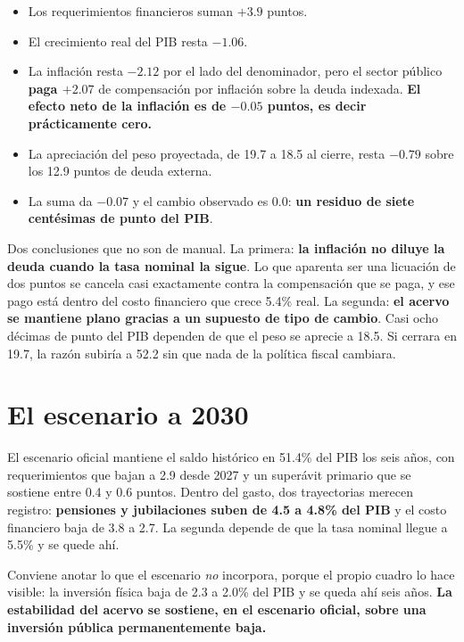 \begin{itemize}
\item Los requerimientos financieros suman \textbf{$+3.9$} puntos.
\item El crecimiento real del PIB resta \textbf{$-1.06$}.
\item La inflación resta \textbf{$-2.12$} por el lado del denominador, pero el
sector público \textbf{paga $+2.07$} de compensación por inflación sobre la deuda
indexada. \textbf{El efecto neto de la inflación es de $-0.05$ puntos, es decir
prácticamente cero.}
\item La apreciación del peso proyectada, de 19.7 a 18.5 al cierre, resta
\textbf{$-0.79$} sobre los 12.9 puntos de deuda externa.
\item La suma da $-0.07$ y el cambio observado es 0.0: \textbf{un residuo de siete
centésimas de punto del PIB}.
\end{itemize}

Dos conclusiones que no son de manual. La primera: \textbf{la inflación no
diluye la deuda cuando la tasa nominal la sigue}. Lo que aparenta ser una
licuación de dos puntos se cancela casi exactamente contra la compensación que se
paga, y ese pago está dentro del costo financiero que crece 5.4\% real. La segunda:
\textbf{el acervo se mantiene plano gracias a un supuesto de tipo de cambio}. Casi
ocho décimas de punto del PIB dependen de que el peso se aprecie a 18.5. Si
cerrara en 19.7, la razón subiría a 52.2 sin que nada de la política fiscal
cambiara.

\section{El escenario a 2030}



El escenario oficial mantiene el saldo histórico en 51.4\% del PIB los seis años,
con requerimientos que bajan a 2.9 desde 2027 y un superávit primario que se
sostiene entre 0.4 y 0.6 puntos. Dentro del gasto, dos trayectorias merecen
registro: \textbf{pensiones y jubilaciones suben de 4.5 a 4.8\% del PIB} y el
costo financiero baja de 3.8 a 2.7. La segunda depende de que la tasa nominal
llegue a 5.5\% y se quede ahí.

Conviene anotar lo que el escenario \emph{no} incorpora, porque el propio cuadro
lo hace visible: la inversión física baja de 2.3 a 2.0\% del PIB y se queda ahí
seis años. \textbf{La estabilidad del acervo se sostiene, en el escenario oficial,
sobre una inversión pública permanentemente baja.}

